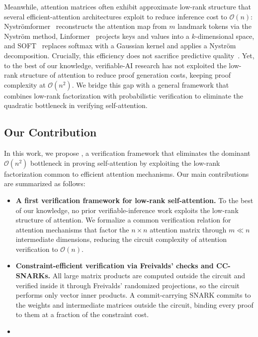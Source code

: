 \documentclass[runningheads]{llncs}
\begin{document}
Meanwhile, attention matrices often exhibit approximate low-rank structure that several efficient-attention architectures exploit to reduce inference cost to $\mathcal{O}(n)$: Nystr\"{o}mformer~\cite{Nystromformer} reconstructs the attention map from $m$ landmark tokens via the Nystr\"{o}m method, Linformer~\cite{Linformer} projects keys and values into a $k$-dimensional space, and SOFT~\cite{SOFT} replaces softmax with a Gaussian kernel and applies a Nystr\"{o}m decomposition. Crucially, this efficiency does not sacrifice predictive quality~\cite{Nystromformer,Linformer}. Yet, to the best of our knowledge, verifiable-AI research has not exploited the low-rank structure of attention to reduce proof generation costs, keeping proof complexity at $\mathcal{O}(n^2)$. We bridge this gap with a general framework that combines low-rank factorization with probabilistic verification to eliminate the quadratic bottleneck in verifying self-attention.

\subsection{Our Contribution}
In this work, we propose \name, a verification framework that eliminates the dominant $\mathcal{O}(n^2)$ bottleneck in proving self-attention by exploiting the low-rank factorization common to efficient attention mechanisms. Our main contributions are summarized as follows:
\begin{itemize}
    \item \textbf{A first verification framework for low-rank self-attention.} To the best of our knowledge, no prior verifiable-inference work exploits the low-rank structure of attention. We formalize a common verification relation for attention mechanisms that factor the $n \times n$ attention matrix through $m \ll n$ intermediate dimensions, reducing the circuit complexity of attention verification to $\mathcal{O}(n)$.
    \item \textbf{Constraint-efficient verification via Freivalds' checks and CC-SNARKs.} All large matrix products are computed outside the circuit and verified inside it through Freivalds' randomized projections, so the circuit performs only vector inner products. A commit-carrying SNARK commits to the weights and intermediate matrices outside the circuit, binding every proof to them at a fraction of the constraint cost.
    \item {}
\end{itemize}
\end{document}
